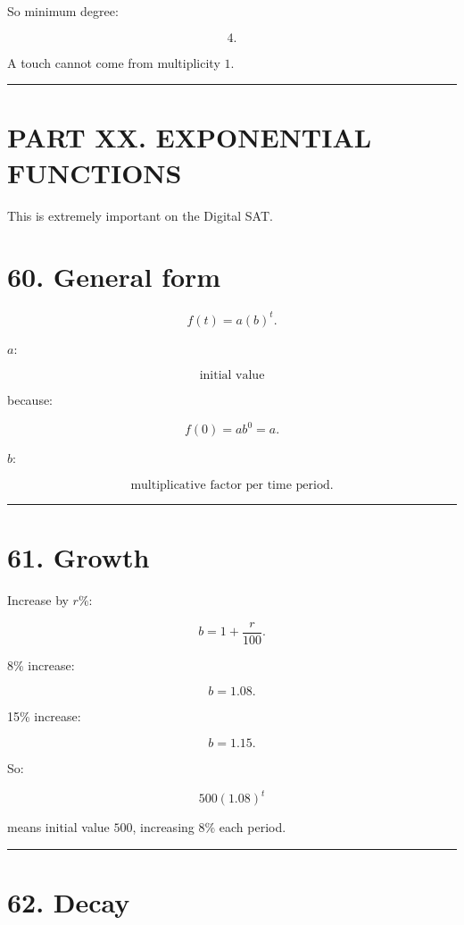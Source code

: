 \documentclass[
]{article}
\begin{document}
So minimum degree:

\[
\boxed4.
\]

A touch cannot come from multiplicity \(1\).

\begin{center}\rule{0.5\linewidth}{0.5pt}\end{center}

\section{PART XX. EXPONENTIAL
FUNCTIONS}\label{part-xx.-exponential-functions}

This is extremely important on the Digital SAT.

\section{60. General form}\label{general-form}

\[
\boxed{f(t)=a(b)^t}.
\]

\(a\):

\[
\boxed{\text{initial value}}
\]

because:

\[
f(0)=ab^0=a.
\]

\(b\):

\[
\boxed{\text{multiplicative factor per time period}}.
\]

\begin{center}\rule{0.5\linewidth}{0.5pt}\end{center}

\section{61. Growth}\label{growth}

Increase by \(r\%\):

\[
\boxed{b=1+\frac r{100}}.
\]

8\% increase:

\[
b=1.08.
\]

15\% increase:

\[
b=1.15.
\]

So:

\[
500(1.08)^t
\]

means initial value \(500\), increasing \(8\%\) each period.

\begin{center}\rule{0.5\linewidth}{0.5pt}\end{center}

\section{62. Decay}\label{decay}
\end{document}
